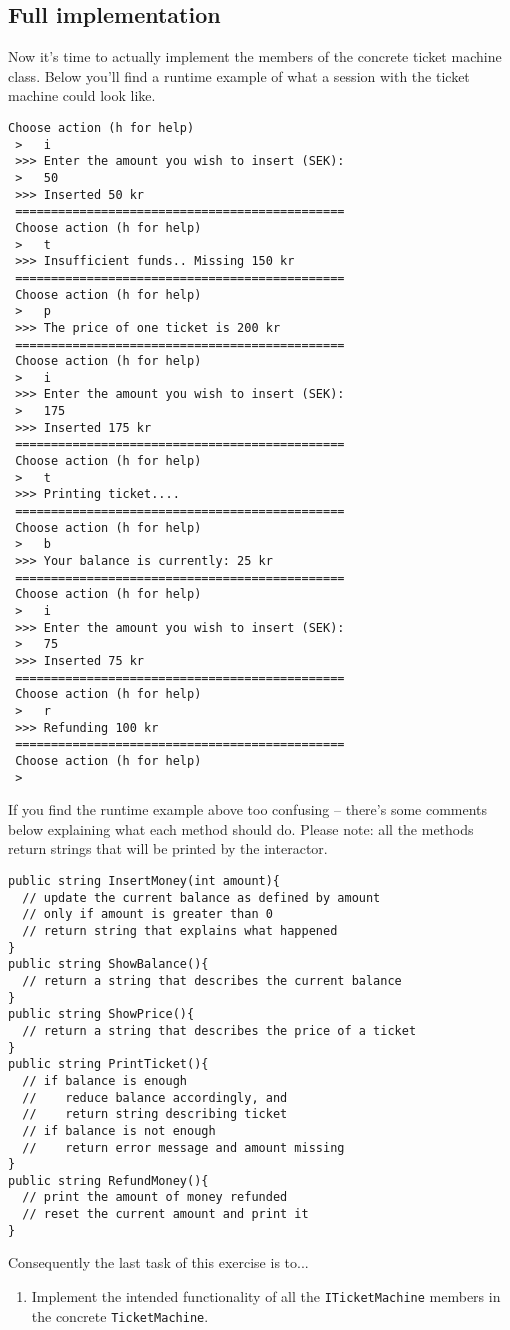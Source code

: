 \documentclass{article}
\newcounter{stepcounter}
\newenvironment{steps}{ 
  \begin{enumerate}[label=\color{red}Step \theenumi)]
    \setcounter{enumi}{\value{stepcounter}}
}{
  \setcounter{stepcounter}{\value{enumi}}
  \end{enumerate}
}
\begin{document}
\subsection{Full implementation}
Now it's time to actually implement the members of the concrete ticket machine class. Below you'll find a runtime example of what a session with the ticket machine could look like.
\begin{lstlisting}[style=terminal]
 Choose action (h for help)
 >   i
 >>> Enter the amount you wish to insert (SEK):
 >   50
 >>> Inserted 50 kr
 ==============================================
 Choose action (h for help)
 >   t
 >>> Insufficient funds.. Missing 150 kr
 ==============================================
 Choose action (h for help)
 >   p
 >>> The price of one ticket is 200 kr
 ==============================================
 Choose action (h for help)
 >   i
 >>> Enter the amount you wish to insert (SEK):
 >   175
 >>> Inserted 175 kr
 ==============================================
 Choose action (h for help)
 >   t
 >>> Printing ticket....
 ==============================================
 Choose action (h for help)
 >   b
 >>> Your balance is currently: 25 kr
 ==============================================
 Choose action (h for help)
 >   i
 >>> Enter the amount you wish to insert (SEK):
 >   75
 >>> Inserted 75 kr
 ==============================================
 Choose action (h for help)
 >   r
 >>> Refunding 100 kr
 ==============================================
 Choose action (h for help)
 >
\end{lstlisting}
If you find the runtime example above too confusing -- there's some comments below explaining what each method should do. Please note: all the methods return strings that will be printed by the interactor.

\begin{lstlisting}
public string InsertMoney(int amount){
  // update the current balance as defined by amount
  // only if amount is greater than 0
  // return string that explains what happened
}
public string ShowBalance(){
  // return a string that describes the current balance
}
public string ShowPrice(){
  // return a string that describes the price of a ticket
}
public string PrintTicket(){
  // if balance is enough
  //    reduce balance accordingly, and
  //    return string describing ticket
  // if balance is not enough
  //    return error message and amount missing
}
public string RefundMoney(){
  // print the amount of money refunded
  // reset the current amount and print it
}
\end{lstlisting}
Consequently the last task of this exercise is to...
\begin{steps}
\item Implement the intended functionality of all the \texttt{ITicketMachine} members in the concrete \texttt{TicketMachine}.
\end{steps}
\end{document}

